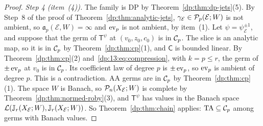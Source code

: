 \begin{proof}
\emph{Step 4 (item~(4)).} The family is DP by Theorem~\ref{dp:thm:dp-jets}(5). By Step~8 of the proof of Theorem~\ref{dp:thm:analytic-jets}, $\gamma_{\mathcal E}\in\mathcal P_p(\mathcal E;W)$ is not ambient, so $\mathfrak a_p(\mathcal E,W)=\infty$ and $\operatorname{ev}_p$ is not ambient, by item~(1). Let $\psi=\psi_{\mathcal E}^{\pm1}$, and suppose that the germ of $\mathsf T^\psi$ at $(v_0,z_0,c_0)$ is in $\mathcal{C}_p$. The slice is an analytic map, so it is in $\mathcal{C}_p$ by Theorem~\ref{dp:thm:cp}(1), and $\mathsf C$ is bounded linear. By Theorem~\ref{dp:thm:cp}(2) and~\eqref{dp:13:eq:compression}, with $k=p\le r$, the germ of $\pm\operatorname{ev}_p$ at $v_0$ is in $\mathcal{C}_p$. Its coefficient law of degree $p$ is $\pm\operatorname{ev}_p$, so $\operatorname{ev}_p$ is ambient of degree $p$. This is a contradiction. AA germs are in $\mathcal{C}_p$ by Theorem~\ref{dp:thm:cp}(1). The space $W$ is Banach, so $\mathcal P_n(X_{\mathcal E};W)$ is complete by Theorem~\ref{dp:thm:normed-roby}(3), and $\mathsf T^\psi$ has values in the Banach space $\mathcal L(\mathbb J_r(X_{\mathcal E};W),\mathbb J_r(X_{\mathcal E};W))$. So Theorem~\ref{dp:thm:chain} applies: $\mathrm{TA}\subseteq\mathcal{C}_p$ among germs with Banach values.
\end{proof}
